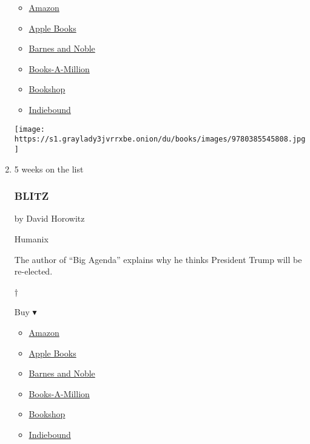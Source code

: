 \begin{enumerate}
  \begin{itemize}
  \tightlist
  \item
    \href{https://www.amazon.com/dp/0385545800?tag=NYTBSREV-20\&tag=NYTBS-20}{Amazon}
  \item
    \href{https://du-gae-books-dot-nyt-du-prd.appspot.com/buy?title=TWILIGHT+OF+DEMOCRACY\&author=Anne+Applebaum}{Apple
    Books}
  \item
    \href{https://www.anrdoezrs.net/click-7990613-11819508?url=https\%3A\%2F\%2Fwww.barnesandnoble.com\%2Fw\%2F\%3Fean\%3D9780385545808}{Barnes
    and Noble}
  \item
    \href{https://www.anrdoezrs.net/click-7990613-35140?url=https\%3A\%2F\%2Fwww.booksamillion.com\%2Fp\%2FTWILIGHT\%2BOF\%2BDEMOCRACY\%2FAnne\%2BApplebaum\%2F9780385545808}{Books-A-Million}
  \item
    \href{https://bookshop.org/a/3546/9780385545808}{Bookshop}
  \item
    \href{https://www.indiebound.org/book/9780385545808?aff=NYT}{Indiebound}
  \end{itemize}

  \texttt{[image: https://s1.graylady3jvrrxbe.onion/du/books/images/9780385545808.jpg]}
\item
  5 weeks on the list

  \hypertarget{blitz}{%
  \subsubsection{BLITZ}\label{blitz}}

  by David Horowitz

  Humanix

  The author of ``Big Agenda'' explains why he thinks President Trump
  will be re-elected.

  †

  Buy ▾

  \begin{itemize}
  \tightlist
  \item
    \href{https://www.amazon.com/dp/1630061387?tag=NYTBSREV-20\&tag=NYTBS-20}{Amazon}
  \item
    \href{https://du-gae-books-dot-nyt-du-prd.appspot.com/buy?title=BLITZ\&author=David+Horowitz}{Apple
    Books}
  \item
    \href{https://www.anrdoezrs.net/click-7990613-11819508?url=https\%3A\%2F\%2Fwww.barnesandnoble.com\%2Fw\%2F\%3Fean\%3D9781630061388}{Barnes
    and Noble}
  \item
    \href{https://www.anrdoezrs.net/click-7990613-35140?url=https\%3A\%2F\%2Fwww.booksamillion.com\%2Fp\%2FBLITZ\%2FDavid\%2BHorowitz\%2F9781630061388}{Books-A-Million}
  \item
    \href{https://bookshop.org/a/3546/9781630061388}{Bookshop}
  \item
    \href{https://www.indiebound.org/book/9781630061388?aff=NYT}{Indiebound}
  \end{itemize}


\end{enumerate}
